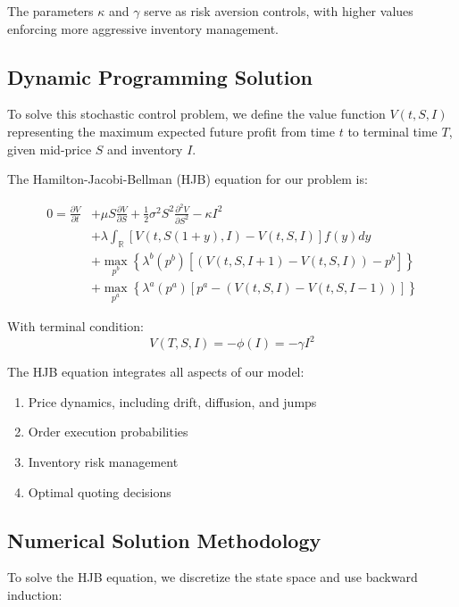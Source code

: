 \documentclass[twocolumn,11pt]{IEEEtran}  %
\begin{document}
\begin{onecolumn}
The parameters $\kappa$ and $\gamma$ serve as risk aversion controls, with higher values enforcing more aggressive inventory management.

\subsection{Dynamic Programming Solution}

To solve this stochastic control problem, we define the value function $V(t, S, I)$ representing the maximum expected future profit from time $t$ to terminal time $T$, given mid-price $S$ and inventory $I$.

The Hamilton-Jacobi-Bellman (HJB) equation for our problem is:

\begin{equation}
\begin{aligned}
0 = \frac{\partial V}{\partial t} &+ \mu S \frac{\partial V}{\partial S} + \frac{1}{2}\sigma^2 S^2 \frac{\partial^2 V}{\partial S^2} - \kappa I^2 \\
&+ \lambda \int_{\mathbb{R}} \left[V(t, S(1+y), I) - V(t, S, I)\right] f(y) dy \\
&+ \max_{p^b} \left\{\lambda^b(p^b) \left[(V(t,S,I+1) - V(t,S,I)) - p^b\right]\right\} \\
&+ \max_{p^a} \left\{\lambda^a(p^a) \left[p^a - (V(t,S,I) - V(t,S,I-1))\right]\right\}
\end{aligned}
\end{equation}

With terminal condition:
\begin{equation}
V(T,S,I) = -\phi(I) = -\gamma I^2
\end{equation}

The HJB equation integrates all aspects of our model:
\begin{enumerate}
    \item Price dynamics, including drift, diffusion, and jumps
    \item Order execution probabilities
    \item Inventory risk management
    \item Optimal quoting decisions
\end{enumerate}

\subsection{Numerical Solution Methodology}

To solve the HJB equation, we discretize the state space and use backward induction:


\end{onecolumn}
\end{document}
